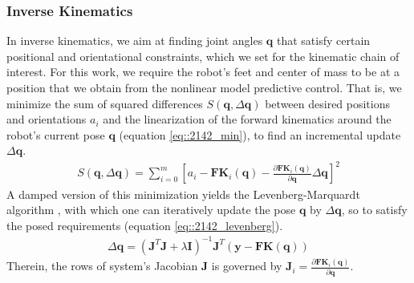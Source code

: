 \subsubsection{Inverse Kinematics}
\label{sec::2142_ik}
In inverse kinematics, we aim at finding joint angles $\bm{q}$ that satisfy certain positional and orientational constraints, which we set for the kinematic chain of interest. For this work, we require the robot's feet and center of mass to be at a position that we obtain from the nonlinear model predictive control. That is, we minimize the sum of squared differences $S(\bm{q},\Delta\bm{q})$ between desired positions and orientations $a_i$ and the linearization of the forward kinematics around the robot's current pose $\bm{q}$ (equation \ref{eq::2142_min}), to find an incremental update $\Delta\bm{q}$. 
\begin{align}
	S(\bm{q},\Delta\bm{q}) = \sum_{i=0}^m\left[a_i-\textbf{FK}_i(\bm{q})-\frac{\partial\textbf{FK}_i(\bm{q})}{\partial\bm{q}}\Delta\bm{q}\right]^2
	\label{eq::2142_min}
\end{align}
A damped version of this minimization yields the Levenberg-Marquardt algorithm \cite{more1978levenberg}, with which one can iteratively update the pose $\bm{q}$ by $\Delta\bm{q}$, so to satisfy the posed requirements (equation \ref{eq::2142_levenberg}).
\begin{align}
	\Delta\bm{q} = (\bm{J}^T\bm{J}+\lambda\bm{I})^{-1}\bm{J}^T(\bm{y}-\textbf{FK}(\bm{q}))
	\label{eq::2142_levenberg}
\end{align}
Therein, the rows of system's Jacobian $\bm{J}$ is governed by $\bm{J}_i=\frac{\partial\textbf{FK}_i(\bm{q})}{\partial\bm{q}}$.